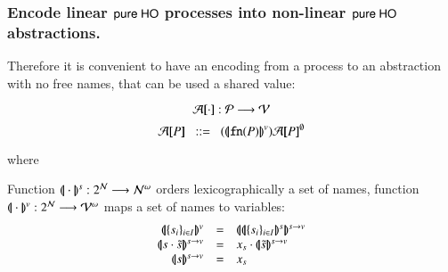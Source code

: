 
\subsubsection{Encode linear $\mathsf{pure\ HO}$ processes into non-linear $\mathsf{pure\ HO}$ abstractions.}

Therefore it is convenient to have an encoding from a process to an abstraction
with no free names, that can be used a shared value:

\[
	\mathcal{A}[\!\![\cdot]\!\!] : \mathcal{P} \longrightarrow \mathcal{V}
\]
\[
	\amap{P} \bnfis \abs{\vmap{\fn{P}}}{\absmap{P}{\es}}
\]

where

Function $(\!|\!|\cdot|\!|\!)^s: 2^{\mathcal{N}} \longrightarrow \mathcal{N}^\omega$
orders lexicographically a set of names, function 
$(\!|\!|\cdot|\!|\!)^v: 2^{\mathcal{N}} \longrightarrow \mathcal{V}^\omega$
maps a set of names to variables:
\[
	\begin{array}{rcl}
		\vmap{\set{s_i}_{i \in I}} &=& \svmap{\smap{\set{s_i}_{i \in I}}}\\
		\svmap{s \cat \tilde{s}} &=& x_s \cat \svmap{\tilde{s}}\\
		\svmap{s} & = & x_s
	\end{array}
\]

